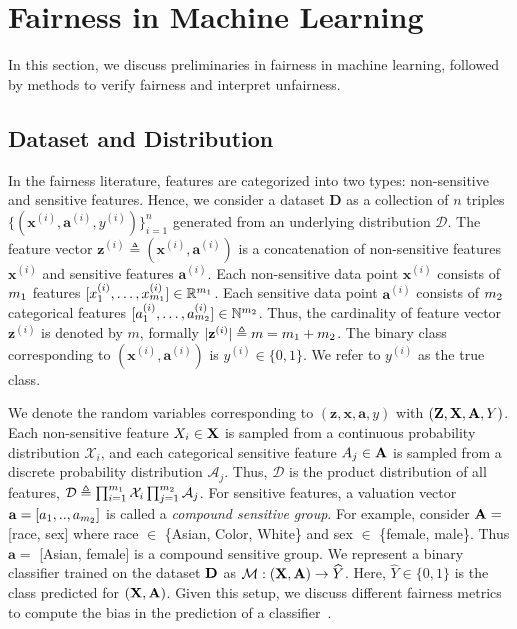 \section{Fairness in Machine Learning}
\label{chapter_fairness_preliminaries}
In this section, we discuss preliminaries in fairness in machine learning, followed by methods to verify fairness and interpret unfairness. 

\subsection{Dataset and Distribution} In the fairness literature, features are categorized into two types: non-sensitive and sensitive features. Hence,
we consider a dataset $ \mathbf{D} $ as a collection of $n$ triples  $\{(\mathbf{x}^{(i)}, \mathbf{a}^{(i)}, y^{(i)})\}_{i=1}^n$  generated from an underlying distribution $\mathcal{D}$. The feature vector $\mathbf{z}^{(i)} \triangleq (\mathbf{x}^{(i)}, \mathbf{a}^{(i)}) $ is a concatenation of non-sensitive features $ \mathbf{x}^{(i)} $ and sensitive features $ \mathbf{a}^{(i)} $. Each non-sensitive data point $\mathbf{x}^{(i)}$ consists of $m_1$ features $[x^{(i)}_1, \dots, x^{(i)}_{m_1}] \in \mathbb{R}^{m_1} $. Each sensitive data point $\mathbf{a}^{(i)}$ consists of $m_2$ categorical features $[a^{(i)}_1, \dots, a^{(i)}_{m_2}] \in \mathbb{N}^{m_2} $. Thus, the cardinality of feature vector $ \mathbf{z}^{(i)} $ is denoted by $ m $, formally $ |\mathbf{z}^{(i)}| \triangleq m = m_1 + m_2 $. The binary class corresponding to $(\mathbf{x}^{(i)}, \mathbf{a}^{(i)})$ is $y^{(i)} \in \{0,1\}$. We refer to $y^{(i)}$ as the true class. 

We denote the random variables corresponding to $ (\mathbf{z}, \mathbf{x}, \mathbf{a},  y) $ with $ (\mathbf{Z}, \mathbf{X}, \mathbf{A}, Y) $. Each non-sensitive feature $ X_i \in \mathbf{X} $ is sampled from a continuous probability distribution {$ \mathcal{X}_i $}, and each categorical sensitive feature $ A_j \in \mathbf{A} $ is sampled from a discrete probability distribution {$ \mathcal{A}_j $}. Thus, $ \mathcal{D} $ is the product distribution of all features, $ \mathcal{D} \triangleq \prod_{i=1}^{m_1}\mathcal{X}_i \prod_{j=1}^{m_2} \mathcal{A}_j $. For sensitive features, a valuation vector $ \mathbf{a} = [a_1, .., a_{m_2}] $ is called a \textit{compound sensitive group}. For example, consider $ \mathbf{A} = $ [race, sex] where race $ \in $ \{Asian, Color, White\} and sex $ \in $ \{female, male\}. Thus $ \mathbf{a} = $ [Asian, female]  is a compound sensitive group. We represent a binary classifier trained on the dataset $\mathbf{D}$ as $\mathcal{M}: (\mathbf{X}, \mathbf{A}) \rightarrow \widehat{Y} $. Here, $\widehat{Y} \in \{0,1\}$ is the class predicted for $ (\mathbf{X}, \mathbf{A}) $. Given this setup, we discuss different fairness metrics to compute the bias in the prediction of a classifier~\cite{feldman2015certifying,hardt2016equality,nabi2018fair}.


